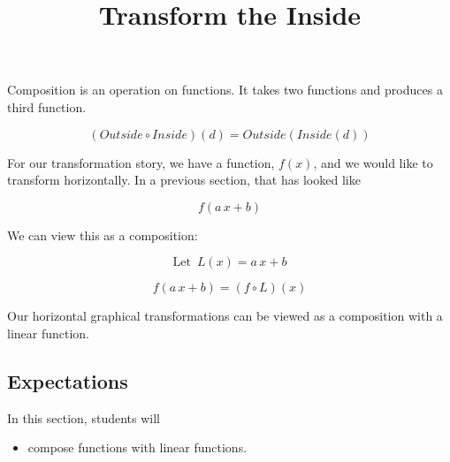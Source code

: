 \documentclass{ximera}
\title{Transform the Inside}
\begin{document}
\begin{abstract}
\end{abstract}
\maketitle






Composition is an operation on functions.  It takes two functions and produces a third function.


\[  (Outside \circ Inside)(d) = Outside(Inside(d))    \]


For our transformation story, we have a function, $f(x)$, and we would like to transform horizontally.  In a previous section, that has looked like


\[   f(a \, x + b)  \]


We can view this as a composition:


\[  \text{Let } \, L(x) = a \, x + b   \]


\[   f(a \, x + b)  = (f \circ L)(x)\]



Our horizontal graphical transformations can be viewed as a composition with a linear function.





\subsection{Expectations}


\begin{sectionOutcomes}
In this section, students will 

\begin{itemize}
\item compose functions with linear functions.
\end{itemize}
\end{sectionOutcomes}
\end{document}
